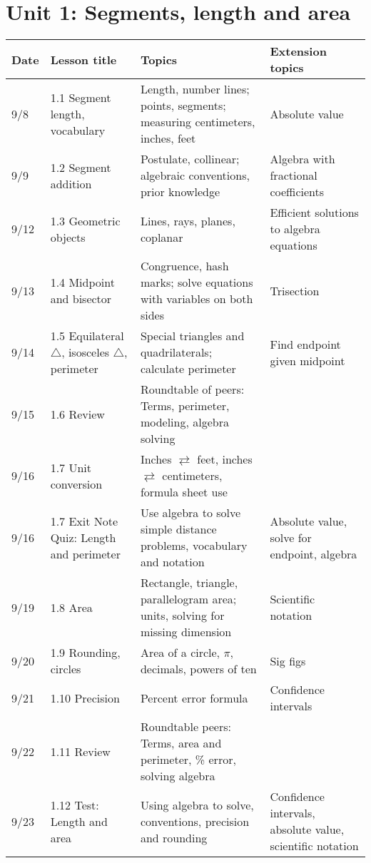 

\geometry{hoffset=-0.5in, textwidth=7.5in}

\fancyhead[RE]{\thepage}
\fancyhead[RO]{\thepage }%



\section*{Unit 1: Segments, length and area}
\begin{tabular}{|p{0.9cm}|p{4cm}|p{7cm}|p{5cm}|}
  \hline
  Date & Lesson title & Topics  & Extension topics \\
  \hline
  9/8 & 1.1 Segment length, vocabulary & Length, number lines; points, segments; measuring centimeters, inches, feet & Absolute value \\
  \hline
  9/9 & 1.2 Segment addition & Postulate, collinear; algebraic conventions, prior knowledge & Algebra with fractional coefficients \\
  \hline
  9/12 & 1.3 Geometric objects & Lines, rays, planes, coplanar & Efficient solutions to algebra equations \\
  \hline
  9/13 & 1.4 Midpoint and bisector & Congruence, hash marks; solve equations with variables on both sides & Trisection \\
  \hline
  9/14 & 1.5 Equilateral $\triangle$, isosceles $\triangle$, perimeter & Special triangles and quadrilaterals; calculate perimeter & Find endpoint given midpoint \\
  \hline
  9/15 & 1.6 Review & Roundtable of peers: Terms, perimeter, modeling, algebra solving & \\
  \hline
  9/16 & 1.7 Unit conversion & Inches $\rightleftarrows$ feet, inches $\rightleftarrows$ centimeters, formula sheet use & \\
  \hline
  9/16 & 1.7 Exit Note Quiz: Length and perimeter & Use algebra to solve simple distance problems, vocabulary and notation & Absolute value, solve for endpoint, algebra \\
  \hline
  9/19 & 1.8 Area & Rectangle, triangle, parallelogram area; units, solving for missing dimension & Scientific notation \\
  \hline
  9/20 & 1.9 Rounding, circles & Area of a circle, $\pi$, decimals, powers of ten & Sig figs \\
  \hline
  9/21 & 1.10 Precision & Percent error formula & Confidence intervals \\
  \hline
  9/22 & 1.11 Review & Roundtable peers: Terms, area and perimeter, \% error, solving algebra & \\
  \hline
  9/23 & 1.12 Test: Length and area & Using algebra to solve, conventions, precision and rounding & Confidence intervals, absolute value, scientific notation \\
  \hline

\end{tabular} \par \vspace*{0.3cm}
